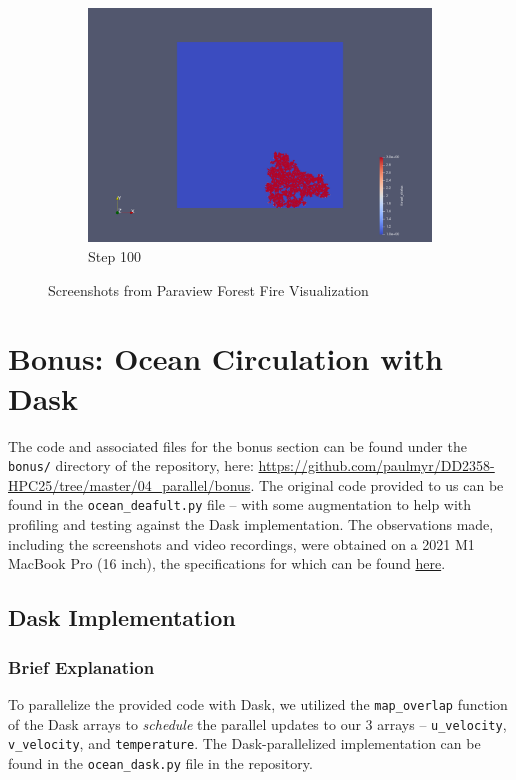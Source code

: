 \documentclass[a4paper,12pt]{article}
\begin{document}
\begin{figure}
\begin{subfigure}{0.4\textwidth}
    \includegraphics[width=\textwidth]{../images/vtk/ex1/step_100.png}
    \caption{Step 100}
\end{subfigure}

\caption{Screenshots from Paraview Forest Fire Visualization}
\end{figure}


\section{Bonus: Ocean Circulation with Dask}
The code and associated files for the bonus section can be found under the \verb|bonus/| directory of the repository, here: \url{https://github.com/paulmyr/DD2358-HPC25/tree/master/04_parallel/bonus}. The original code provided to us can be found in the \verb|ocean_deafult.py| file -- with some augmentation to help with profiling and testing against the Dask implementation. The observations made, including the screenshots and video recordings, were obtained on a 2021 M1 MacBook Pro (16 inch), the specifications for which can be found \href{https://support.apple.com/en-us/111901}{here}.

\subsection{Dask Implementation}

\subsubsection{Brief Explanation}
To parallelize the provided code with Dask, we utilized the \verb|map_overlap| function of the Dask arrays to \textit{schedule} the parallel updates to our 3 arrays -- \verb|u_velocity|, \verb|v_velocity|, and \verb|temperature|. The Dask-parallelized implementation can be found in the \verb|ocean_dask.py| file in the repository.
\end{document}
